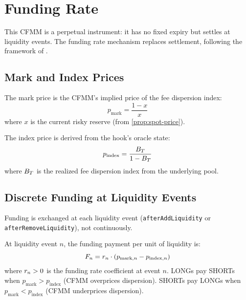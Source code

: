 
\section{Funding Rate}\label{sec:funding-rate}

This CFMM is a perpetual instrument: it has no fixed expiry but settles at
liquidity events. The funding rate mechanism replaces settlement, following
the framework of \cite{angeris2022perpetuals}.

\subsection{Mark and Index Prices}

\begin{definition}\label{def:mark-price}
The mark price is the CFMM's implied price of the fee dispersion index:
\begin{equation}\label{eq:mark-price}
  p_{\text{mark}} = \frac{1 - x}{x}
\end{equation}
where $x$ is the current risky reserve (from \cref{prop:spot-price}).
\end{definition}

\begin{definition}\label{def:index-price}
The index price is derived from the hook's oracle state:
\begin{equation}\label{eq:index-price}
  p_{\text{index}} = \frac{B_T}{1 - B_T}
\end{equation}
where $B_T$ is the realized fee dispersion index from the underlying pool.
\end{definition}

\subsection{Discrete Funding at Liquidity Events}

Funding is exchanged at each liquidity event (\texttt{afterAddLiquidity} or
\texttt{afterRemoveLiquidity}), not continuously.

\begin{definition}\label{def:funding-payment}
At liquidity event $n$, the funding payment per unit of liquidity is:
\begin{equation}\label{eq:funding-payment}
  F_n = r_n \cdot (p_{\text{mark},n} - p_{\text{index},n})
\end{equation}
where $r_n > 0$ is the funding rate coefficient at event $n$.
LONGs pay SHORTs when $p_{\text{mark}} > p_{\text{index}}$ (CFMM overprices dispersion).
SHORTs pay LONGs when $p_{\text{mark}} < p_{\text{index}}$ (CFMM underprices dispersion).
\end{definition}


